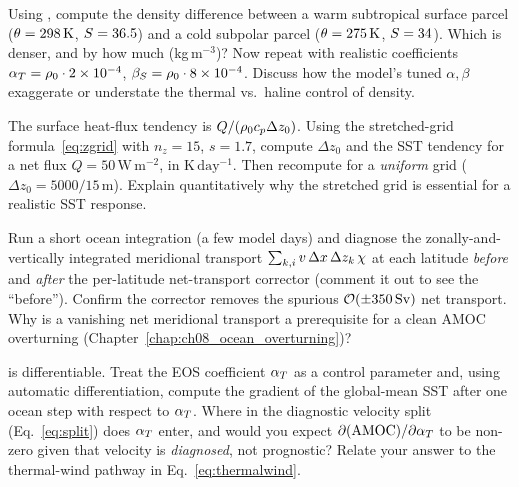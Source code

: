 \begin{exercise}
Using , compute the density difference between a
warm subtropical surface parcel ($\theta=298\,\mathrm{K}$, $S=36.5$) and
a cold subpolar parcel ($\theta=275\,\mathrm{K}$, $S=34$). Which is
denser, and by how much (kg\,m$^{-3}$)? Now repeat with realistic
coefficients $\alpha_T=\rho_0\cdot2\times10^{-4}$,
$\beta_S=\rho_0\cdot8\times10^{-4}$. Discuss how the model's tuned $\alpha,\beta$
exaggerate or understate the thermal vs.\ haline control of density.
\end{exercise}

\begin{exercise}
The surface heat-flux tendency is $Q/(\rho_0 c_p \Delta z_0)$. Using the
stretched-grid formula~\eqref{eq:zgrid} with $n_z=15$, $s=1.7$, compute
$\Delta z_0$ and the SST tendency for a net flux $Q=50\,\mathrm{W\,m^{-2}}$,
in $\mathrm{K\,day^{-1}}$. Then recompute for a \emph{uniform} grid
($\Delta z_0=5000/15\,\mathrm{m}$). Explain quantitatively why the
stretched grid is essential for a realistic SST response.
\end{exercise}

\begin{exercise}
Run a short ocean integration (a few model days) and diagnose the
zonally-and-vertically integrated meridional transport
$\sum_{k,i} v\,\Delta x\,\Delta z_k\,\chi$ at each latitude
\emph{before} and \emph{after} the per-latitude net-transport corrector
(comment it out to see the ``before''). Confirm the corrector removes the
spurious $\mathcal{O}(\pm350\,\mathrm{Sv})$ net transport. Why is a vanishing net
meridional transport a prerequisite for a clean AMOC overturning
(Chapter~\ref{chap:ch08_ocean_overturning})?
\end{exercise}

\begin{exercise}
\model{} is differentiable. Treat the EOS coefficient $\alpha_T$ as a control
parameter and, using \jax{} automatic differentiation, compute the gradient
of the global-mean SST after one ocean step with respect to $\alpha_T$.
Where in the diagnostic velocity split (Eq.~\ref{eq:split}) does $\alpha_T$
enter, and would you expect $\partial(\text{AMOC})/\partial\alpha_T$ to be
non-zero given that velocity is \emph{diagnosed}, not prognostic? Relate
your answer to the thermal-wind pathway in Eq.~\eqref{eq:thermalwind}.
\end{exercise}
